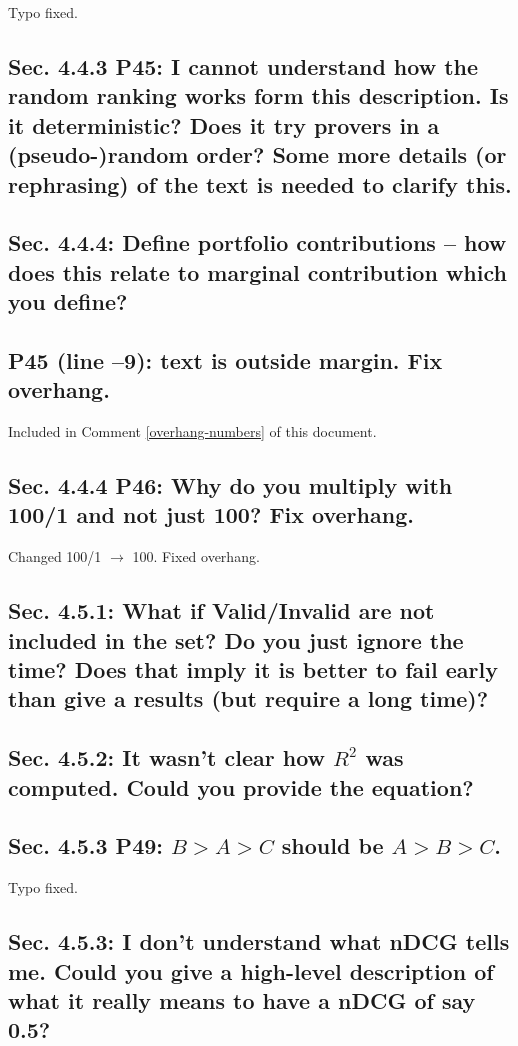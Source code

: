 \documentclass[]{article}
\begin{document}
Typo fixed.

\subsection{Sec. 4.4.3 P45: I cannot understand how the random ranking works form this description. Is it deterministic? Does it try provers in a (pseudo-)random order? Some more details (or rephrasing) of the text is needed to clarify this.}

\subsection{Sec. 4.4.4: Define portfolio contributions – how does this relate to marginal contribution which you define?}

\subsection{P45 (line –9): text is outside margin. Fix overhang.}

Included in Comment \ref{overhang-numbers} of this document.

\subsection{Sec. 4.4.4 P46: Why do you multiply with 100/1 and not just 100? Fix overhang.}

Changed 100/1 $\rightarrow$ 100. Fixed overhang.

\subsection{Sec. 4.5.1: What if Valid/Invalid are not included in the set? Do you just ignore the time? Does that imply it is better to fail early than give a results (but require a long time)?}

\subsection{Sec. 4.5.2: It wasn't clear how $R^{2}$ was computed. Could you provide the equation?}

\subsection{Sec. 4.5.3 P49: $B > A > C$ should be $A > B > C$.}

Typo fixed.

\subsection{Sec. 4.5.3: I don't understand what nDCG tells me. Could you give a high-level description of what it really means to have a nDCG of say 0.5?}
\end{document}
